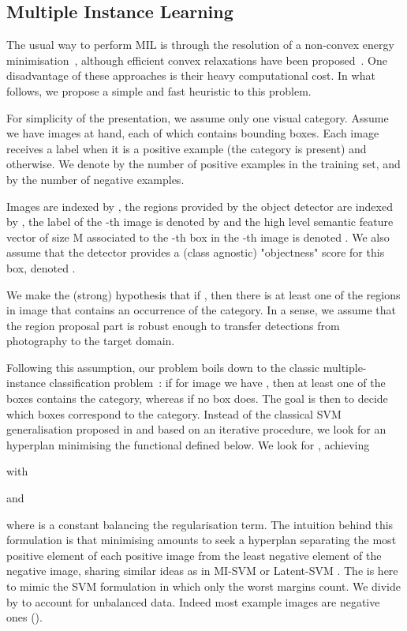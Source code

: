 \documentclass[runningheads]{llncs}
\begin{document}
\subsection{Multiple Instance Learning}
\label{MILsection}

 The usual way to perform MIL is through the resolution of a non-convex energy minimisation~\cite{andrews_support_2003}, although efficient convex relaxations have been proposed~\cite{joulin2012convex}. One disadvantage of these approaches is their heavy computational cost. In what follows, we propose a simple and fast heuristic to this problem. 



For simplicity of the presentation, we assume only one visual category. Assume we have  images at hand, each of which contains  bounding boxes. Each image receives a label  when it is a positive example (the category is present) and  otherwise. We denote by  the number of positive examples  in the training set, and by  the number of negative examples.



Images are indexed by , the  regions provided by the object detector are indexed by , the label of the -th image is denoted by  and the high level semantic feature vector of size M associated to the -th box in the -th image is denoted . We also assume that the detector provides a (class agnostic) "objectness" score for this box, denoted .

We make the (strong) hypothesis that if , then there is at least one of the  regions in image  that contains an occurrence of the category. In a sense, we assume that the region proposal part is robust enough to transfer detections from photography to the target domain.

Following this assumption, our problem boils down to the classic multiple-instance classification problem~\cite{dietterich1997solving}: if for image  we have , then at least one of the boxes contains the category, whereas if  no box does. The goal is then to decide which boxes correspond to the category. Instead of the classical SVM generalisation proposed in \cite{andrews_support_2003} and based on an iterative procedure, we look for an hyperplan minimising the functional defined below. We look for ,  achieving


 with 




and 

where  is a constant balancing the regularisation term. 
The intuition behind this formulation is that minimising  amounts to seek a hyperplan separating the most positive element of each positive image from the least negative element of the negative image, sharing similar ideas as in
MI-SVM \cite{andrews_support_2003} or Latent-SVM \cite{felzenszwalb_object_2010}. The  is here to mimic the SVM formulation in which only the worst margins count. 
We divide by  to account for unbalanced data. Indeed most example images are negative ones ().
\end{document}
